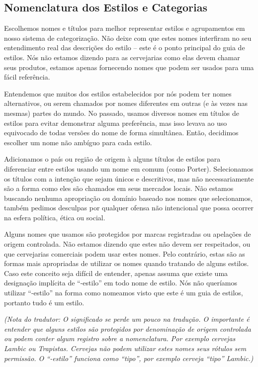 \subsection*{Nomenclatura dos Estilos e Categorias}

Escolhemos nomes e títulos para melhor representar estilos e agrupamentos em nosso sistema de categorização.  Não deixe com que estes nomes interfiram no seu entendimento real das descrições do estilo – este é o ponto principal do guia de estilos. Nós não estamos dizendo para as cervejarias como elas devem chamar seus produtos, estamos apenas fornecendo nomes que podem ser usados para uma fácil referência.

Entendemos que muitos dos estilos estabelecidos por nós podem ter nomes alternativos, ou serem chamados por nomes diferentes em outras (e às vezes nas mesmas) partes do mundo. No passado, usamos diversos nomes em títulos de estilos para evitar demonstrar alguma preferência, mas isso levava ao uso equivocado de todas versões do nome de forma simultânea. Então, decidimos escolher um nome não ambíguo para cada estilo.

Adicionamos o país ou região de origem à alguns títulos de estilos para diferenciar entre estilos usando um nome em comum (como Porter). Selecionamos os títulos com a intenção que sejam únicos e descritivos, mas não necessariamente são a forma como eles são chamados em seus mercados locais. Não estamos buscando nenhuma apropriação ou domínio baseado nos nomes que selecionamos, também pedimos desculpas por qualquer ofensa não intencional que possa ocorrer na esfera política, ética ou social.

Alguns nomes que usamos são protegidos por marcas registradas ou apelações de origem controlada. Não estamos dizendo que estes não devem ser respeitados, ou que cervejarias comerciais podem usar estes nomes. Pelo contrário, estas são as formas mais apropriadas de utilizar os nomes quando tratando de alguns estilos. Caso este conceito seja difícil de entender, apenas assuma que existe uma designação implícita de “-estilo” em todo nome de estilo. Nós não queríamos utilizar “-estilo” na forma como nomeamos visto que este é um guia de estilos, portanto tudo é um estilo.

\textit{(Nota do tradutor: O significado se perde um pouco na tradução. O importante é entender que alguns estilos são protegidos por denominação de origem controlada ou podem conter algum registro sobre a nomenclatura. Por exemplo cervejas Lambic ou Trapistas. Cervejas não podem utilizar estes nomes seus rótulos sem permissão. O “-estilo” funciona como “tipo”, por exemplo cerveja “tipo” Lambic.)}